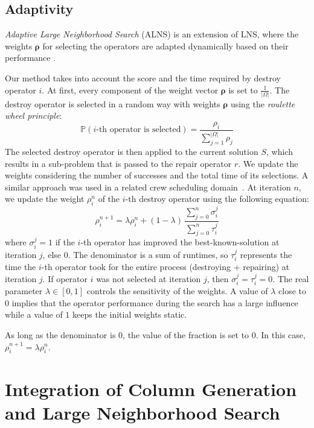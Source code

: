 \documentclass[]{amsart}
\newcommand{\abs}[1]{\left\lvert #1 \right\rvert}
\theoremstyle{plain}
\begin{document}
\subsection{Adaptivity}
\textit{Adaptive Large Neighborhood Search} (ALNS) is an extension of LNS, where the weights $\bm \rho$  for selecting the operators are adapted dynamically based on their performance \cite{Ropke2006}.

Our method takes into account the score and the time required by  destroy operator $i$. 
At first, every component of the weight vector $\bm \rho$ is set to $\frac{1}{\abs{\Omega}}$.
The destroy operator is selected in a random way with weights $\bm \rho$ using the \textit{roulette wheel principle}:%
\begin{equation}
    \mathbb{P}\left(\text{$i$-th operator is selected}\right) = \frac{\rho_i}{\sum_{j=1}^{\lvert{\Omega}\rvert}\rho_j}
\end{equation}
    The selected destroy operator is then applied to the current solution $S$, which results in a sub-problem that is passed to the repair operator $r$. We update the weights considering the number of successes and the total time of its selections. A similar approach was used in a related crew scheduling domain~\cite{carmo2019adaptive}.
At iteration $n$, we update the weight $\rho^n_i$ of the $i$-th destroy operator  using the following equation:
\begin{equation}\label{eq:weights_update}
	\rho^{n+1}_i=  \lambda\rho^n_i + (1-\lambda)\,\frac{\sum_{j=0}^{n}\sigma^j_i}{\sum_{j=0}^n\tau^j_i}
\end{equation}
where
$\sigma^j_i = 1$ if the $i$-th operator has improved the best-known-solution at iteration $j$, else $0$. The denominator is a sum of runtimes, so $\tau^j_i$ represents the time the $i$-th operator took for the entire process (destroying + repairing) at iteration $j$. If operator $i$ was not selected at iteration $j$, then $\sigma^j_i=\tau^j_i=0$. The real parameter $\lambda\in [0,1]$ controls the sensitivity of the weights. A value of $\lambda$ close to $0$ implies that the operator performance during the search has a large influence while a value of $1$ keeps the initial weights static.

As long as the denominator is $0$, the value of the fraction is set to $0$. In this case, $\rho^{n+1}_i= \lambda\rho^n_i$.


\section{Integration of Column Generation and Large Neighborhood Search}
\label{sec:integration}
\end{document}
